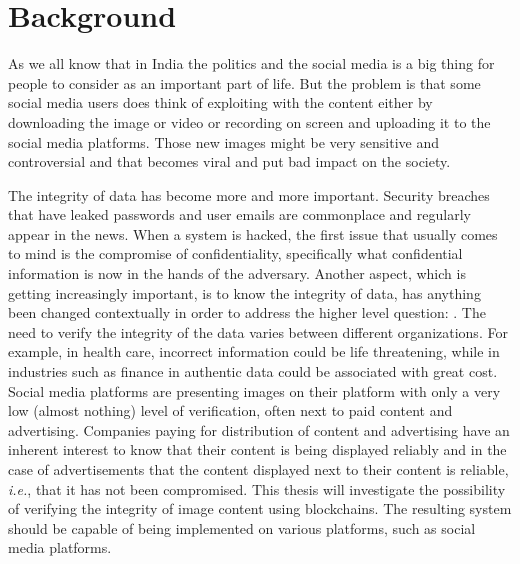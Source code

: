 \chapter{Background}
\label{ch:2}
\bigskip
As we all know that in India the politics and the social media is a big thing for people to consider as an important part of life. But the problem is that some social media users does think of exploiting with the content either by downloading the image or video or recording on screen and uploading it to the social media platforms. Those new images might be very sensitive and controversial and that becomes viral and put bad impact on the society.

The integrity of data has become more and more important. Security breaches that have leaked passwords and user emails are commonplace and regularly appear in the news. When a system is hacked, the first issue that usually comes to mind is the compromise of confidentiality, specifically what confidential information is now in the hands of the adversary.
Another aspect, which is getting increasingly important, is to know the integrity of data, has anything been changed contextually in order to address the higher level question: .
The need to verify the integrity of the data varies between different organizations. For example, in health care, incorrect information could be life threatening, while in industries such as finance in authentic data could be associated with great cost. Social media platforms are presenting images on their platform with only a very low (almost nothing) level of verification, often next to paid content and advertising. Companies paying for distribution of content and advertising have an inherent interest to know that their content is being displayed reliably and in the case of advertisements that the content displayed next to their content is reliable, \textit{i.e.}, that it has not been compromised.
This thesis will investigate the possibility of verifying the integrity of image content using blockchains. The resulting system should be capable of being implemented on various platforms, such as social media platforms.


